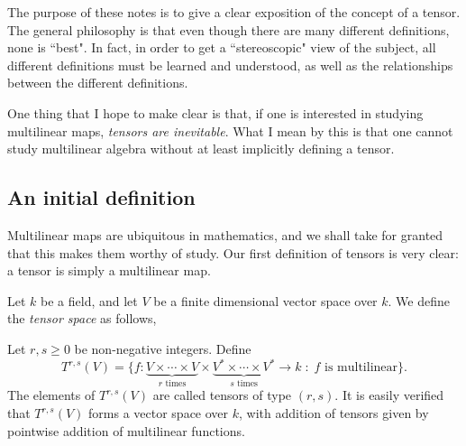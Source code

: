 The purpose of these notes is to give a clear exposition of the concept of a tensor.
The general philosophy is that even though there are many different definitions,
none is ``best". In fact, in order to get a ``stereoscopic" view
of the subject, all different definitions must be learned and understood, as
well as the relationships between the different definitions.

One thing that I hope to make clear is that, if one is interested
in studying multilinear maps, \emph{tensors are inevitable}. What I mean by
this is that one cannot study multilinear algebra without at least implicitly
defining a tensor.

\subsection{An initial definition}

Multilinear maps are ubiquitous in mathematics, and we shall take for granted 
that this makes them worthy of study. Our first definition of tensors
is very clear: a tensor is simply a multilinear map.

Let $k$ be a field, and let $V$ be a finite dimensional vector space over $k$.
We define the \emph{tensor space} as follows,
\begin{definition}
    Let $r,s \geq 0$ be non-negative integers. Define
    \begin{equation*}
        T^{r,s}(V) = \{f:\underbrace{V\times \cdots \times V}_{r\text{ times}} \times \underbrace{V^* \times \cdots \times V^*}_{s\text{ times}} \rightarrow k\;:\; f\text{ is multilinear}\}.
    \end{equation*}
    The elements of $T^{r,s}(V)$ are called tensors of type $(r,s)$.
    It is easily verified that $T^{r,s}(V)$ forms a vector space over $k$, with
    addition of tensors given by pointwise addition of multilinear functions.    
\end{definition}

